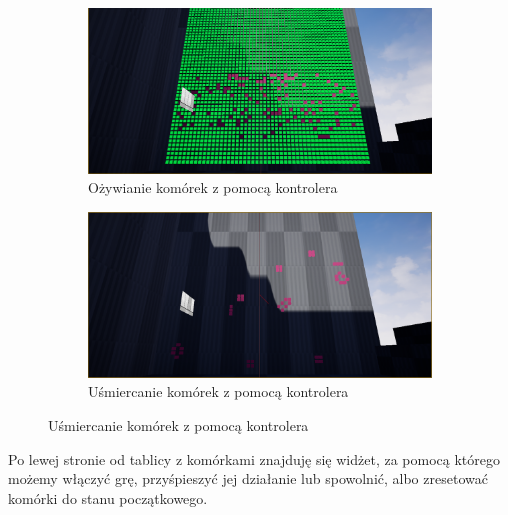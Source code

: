 \documentclass[a4paper,12pt,reqno]{article}
\begin{document}
\begin{figure}[!ht]%
	\centering
	\begin{subfigure}{.5\textwidth}
		\centering
		\includegraphics[width=0.9\linewidth]{graphics/gameoflife/GOLInUE_1.png}
		\caption{Ożywianie komórek z pomocą kontrolera}	
		\label{ref:subref_a}
	\end{subfigure}%
	\begin{subfigure}{.5\textwidth}
		\centering
		\includegraphics[width=0.9\linewidth]{graphics/gameoflife/GOLInUE_2.png}
		\caption{Uśmiercanie komórek z pomocą kontrolera}
		\label{ref:subref_b}
	\end{subfigure}%
\label{ref:ref}
\end{figure}

Po lewej stronie od tablicy z komórkami znajduję się widżet, za pomocą którego możemy włączyć grę, przyśpieszyć jej działanie lub spowolnić, albo zresetować komórki do stanu początkowego. 
\end{document}
